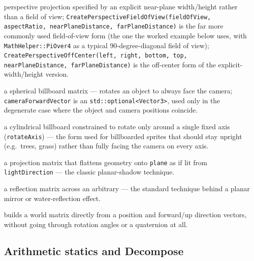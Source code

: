 \begin{description}
  perspective projection specified by an explicit near-plane width/height rather than a field
  of view; \texttt{CreatePerspectiveFieldOfView(fieldOfView, aspectRatio, nearPlaneDistance,
  farPlaneDistance)} is the far more commonly used field-of-view form (the one the worked
  example below uses, with \texttt{MathHelper::PiOver4} as a typical 90-degree-diagonal field of
  view); \texttt{CreatePerspectiveOffCenter(left, right, bottom, top, nearPlaneDistance,
  farPlaneDistance)} is the off-center form of the explicit-width/height version.
\item[\texttt{CreateBillboard(objectPosition, cameraPosition, cameraUpVector,
  cameraForwardVector)}] a spherical billboard matrix --- rotates an object to always face the
  camera; \texttt{cameraForwardVector} is an \texttt{std::optional<Vector3>}, used only in the
  degenerate case where the object and camera positions coincide.
\item[\texttt{CreateConstrainedBillboard(objectPosition, cameraPosition, rotateAxis,
  cameraForwardVector, objectForwardVector)}] a cylindrical billboard constrained to rotate only
  around a single fixed axis (\texttt{rotateAxis}) --- the form used for billboarded sprites
  that should stay upright (e.g.\ trees, grass) rather than fully facing the camera on every
  axis.
\item[\texttt{CreateShadow(lightDirection, plane)}] a projection matrix that flattens geometry
  onto \texttt{plane} as if lit from \texttt{lightDirection} --- the classic planar-shadow
  technique.
\item[\texttt{CreateReflection(plane)}] a reflection matrix across an arbitrary 
  --- the standard technique behind a planar mirror or water-reflection effect.
\item[\texttt{CreateWorld(position, forward, up)}] builds a world matrix directly from a
  position and forward/up direction vectors, without going through rotation angles or a
  quaternion at all.
\end{description}

\subsection{Arithmetic statics and Decompose}
\label{sec:matrix-arithmetic}

